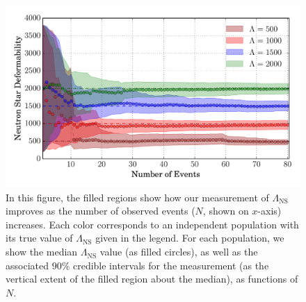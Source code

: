 \documentclass[aps,prd,amsmath,floats,floatfix, twocolumn,
superscriptaddress,nofootinbib,showpacs]{revtex4-1}
\newcommand{\lambdans}{\Lambda_\mathrm{NS}}
\begin{document}
%
%
\begin{figure}
\centering    
\includegraphics[width=1.05\columnwidth,trim=1cm 0 0 0]{plots/FillBetweenRelErrorBarsLambda_vs_NShifted_AllLambda.pdf}
\caption{%
In this figure, the filled regions show how our measurement of $\lambdans$
improves as the number of observed events ($N$, shown on $x$-axis) increases.
Each color corresponds to an independent population with its true value of
$\lambdans$ given in the legend. For each population, we show the median 
$\lambdans$ value (as filled circles), as well as the associated
$90\%$ credible intervals for the measurement (as the vertical extent of the
filled region about the median), as functions of $N$.
}
\label{fig:TT_Lambda_vs_N_CI90_0}
\end{figure}
\end{document}
